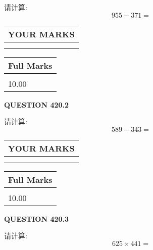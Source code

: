 \documentclass{ctexart}
\begin{document}
  
 
请计算:
\begin{equation}
955 -   %
371 = \nonumber
\end{equation}
 

 

 
  
\vspace{0.2in}
  
\noindent\begin{tabular}{|l|}
\hline
 YOUR MARKS  \\
\hline
 \\ 
 \\ 
\hline
\end{tabular}
\hspace{0.05in} \begin{tabular}{|l|}
\hline
 Full Marks  \\
\hline
 \\ 
10.00 \\
\hline
\end{tabular}
{\textbf{\Large{QUESTION
420.2 
}}}
  
  
 
请计算:
\begin{equation}
589 -   %
343 = \nonumber
\end{equation}
 

 

 
  
\vspace{0.2in}
  
\noindent\begin{tabular}{|l|}
\hline
 YOUR MARKS  \\
\hline
 \\ 
 \\ 
\hline
\end{tabular}
\hspace{0.05in} \begin{tabular}{|l|}
\hline
 Full Marks  \\
\hline
 \\ 
10.00 \\
\hline
\end{tabular}
{\textbf{\Large{QUESTION
420.3 
}}}
  
  
 
请计算:
\begin{equation}
625  \times    %
441 = \nonumber
\end{equation}
 

 

 
  
\vspace{0.2in}
  
\end{document}
